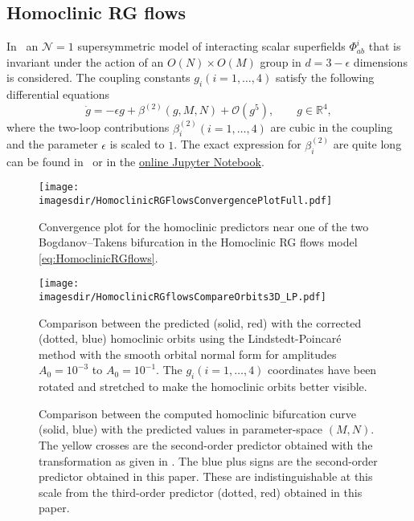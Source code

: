 \subsection{Homoclinic RG flows}
In~\cite{Jepsen2021HomoclinicRG} an $\mathcal N = 1$ supersymmetric model of interacting
scalar superfields $\Phi_{ab}^i$ that is invariant under the action of an $O(N)
\times O(M)$ group in $d = 3 - \epsilon$ dimensions is considered.
The coupling constants $g_i(i=1,\dots,4)$ satisfy the following differential
equations
\begin{equation}
    \label{eq:HomoclinicRGflows}
    \dot g = -\epsilon g + \beta^{(2)}(g,M,N) + \mathcal O(g^5),  \qquad g\in\mathbb R^4,
\end{equation} 
where the two-loop contributions $\beta_i^{(2)}(i=1,\dots,4)$ are cubic in the
coupling and the parameter $\epsilon$ is scaled to $1$.  The exact expression for
$\beta_i^{(2)}$ are quite long can be found in~\cite[Appendix B]{Jepsen2021HomoclinicRG}
or in the \href{https://mmbosschaert.github.io/MatCont7p2NewInitBTHom-/}{online Jupyter
Notebook}.
\begin{figure}[b!]
    \texttt{[image: \\imagesdir/HomoclinicRGFlowsConvergencePlotFull.pdf]}
    \caption{Convergence plot for the homoclinic predictors near one of the
        two Bogdanov--Takens bifurcation in the Homoclinic RG flows model 
        \cref{eq:HomoclinicRGflows}.}
    \label{fig:HomoclinicRGFlowsConvergencePlot}
\end{figure}
%
\begin{figure}[t!]
    \texttt{[image: \\imagesdir/HomoclinicRGflowsCompareOrbits3D\_LP.pdf]}
    \caption{Comparison between the predicted (solid, red) with the corrected
        (dotted, blue) homoclinic orbits using the Lindstedt-Poincar\'e method
        with the smooth orbital normal form for amplitudes $A_0 = 10^{-3}$ to
        $A_0=10^{-1}$. The $g_i(i=1,\dots,4)$ coordinates have been rotated and stretched
        to make the homoclinic orbits better visible.}
    \label{fig:HomoclinicRGFlows}
\end{figure}
%
\ifthesis
\begin{figure}[t!]
\caption{Comparison between the computed homoclinic bifurcation curve
    (solid, blue) with the predicted values in parameter-space $(M,N)$.
    The yellow crosses are the second-order predictor obtained with the
    transformation as given in {\cite{Al-Hdaibat2016}}. The blue plus
    signs are the second-order predictor obtained in this paper. These are
    indistinguishable at this scale from the third-order
    predictor (dotted, red) obtained in this paper.}
\label{fig:HomoclinicRGFlowsParameters}
\end{figure}
\fi

